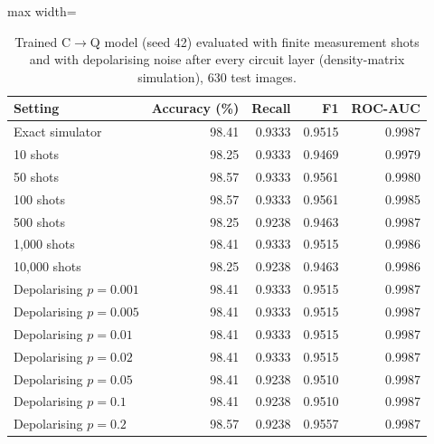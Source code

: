 \begin{table}[htbp]
\centering
\small
\caption{Trained C$\rightarrow$Q model (seed 42) evaluated with finite measurement shots and with depolarising noise after every circuit layer (density-matrix simulation), 630 test images.}
\label{tab:hardware}
\begin{adjustbox}{max width=\linewidth}
\begin{tabular}{lrrrr}
\toprule
Setting & Accuracy (\%) & Recall & F1 & ROC-AUC \\
\midrule
Exact simulator & 98.41 & 0.9333 & 0.9515 & 0.9987 \\
10 shots & 98.25 & 0.9333 & 0.9469 & 0.9979 \\
50 shots & 98.57 & 0.9333 & 0.9561 & 0.9980 \\
100 shots & 98.57 & 0.9333 & 0.9561 & 0.9985 \\
500 shots & 98.25 & 0.9238 & 0.9463 & 0.9987 \\
1,000 shots & 98.41 & 0.9333 & 0.9515 & 0.9986 \\
10,000 shots & 98.25 & 0.9238 & 0.9463 & 0.9986 \\
Depolarising $p=0.001$ & 98.41 & 0.9333 & 0.9515 & 0.9987 \\
Depolarising $p=0.005$ & 98.41 & 0.9333 & 0.9515 & 0.9987 \\
Depolarising $p=0.01$ & 98.41 & 0.9333 & 0.9515 & 0.9987 \\
Depolarising $p=0.02$ & 98.41 & 0.9333 & 0.9515 & 0.9987 \\
Depolarising $p=0.05$ & 98.41 & 0.9238 & 0.9510 & 0.9987 \\
Depolarising $p=0.1$ & 98.41 & 0.9238 & 0.9510 & 0.9987 \\
Depolarising $p=0.2$ & 98.57 & 0.9238 & 0.9557 & 0.9987 \\
\bottomrule
\end{tabular}
\end{adjustbox}
\end{table}
